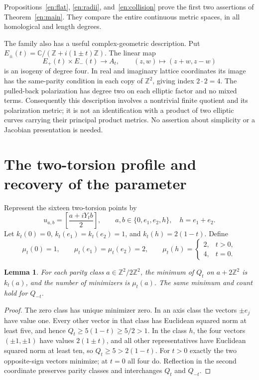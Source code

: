 \documentclass[12pt]{amsart}
\newcommand{\LemmaName}{Lemma}
\newtheorem{lem}[thm]{\LemmaName}
\theoremstyle{definition}
\theoremstyle{remark}
\numberwithin{equation}{section}
\newcommand{\Z}{\mathbb{Z}}
\newcommand{\C}{\mathbb{C}}
\begin{document}
Propositions~\ref{en:flat}, \ref{en:radii}, and~\ref{en:collision} prove the first two assertions of Theorem~\ref{en:main}. They compare the entire continuous metric spaces, in all homological and length degrees.

The family also has a useful complex-geometric description. Put
$E_\pm(t)=\C/(\Z+i(1\pm t)\Z)$.
The linear map
\begin{equation}\label{en:gluing}
E_+(t)\times E_-(t)\longrightarrow A_t,
\qquad (z,w)\longmapsto(z+w,z-w)
\end{equation}
is an isogeny of degree four. In real and imaginary lattice coordinates its image has the same-parity condition in each copy of $\Z^2$, giving index $2\cdot2=4$. The pulled-back polarization has degree two on each elliptic factor and no mixed terms. Consequently this description involves a nontrivial finite quotient and its polarization metric; it is not an identification with a product of two elliptic curves carrying their principal product metrics. No assertion about simplicity or a Jacobian presentation is needed.

\section{The two-torsion profile and recovery of the parameter}
Represent the sixteen two-torsion points by
\[
u_{a,b}=\left[\frac{a+iY_tb}{2}\right],\qquad
a,b\in\{0,e_1,e_2,h\},\quad h=e_1+e_2.
\]
Let $k_t(0)=0$, $k_t(e_1)=k_t(e_2)=1$, and $k_t(h)=2(1-t)$. Define
\[
\mu_t(0)=1,\qquad \mu_t(e_1)=\mu_t(e_2)=2,
\qquad
\mu_t(h)=\begin{cases}2,&t>0,\\4,&t=0.\end{cases}
\]

\begin{lem}\label{en:parity}
For each parity class $a\in\Z^2/2\Z^2$, the minimum of $Q_t$ on $a+2\Z^2$ is $k_t(a)$, and the number of minimizers is $\mu_t(a)$. The same minimum and count hold for $Q_{-t}$.
\end{lem}
\begin{proof}
The zero class has unique minimizer zero. In an axis class the vectors $\pm e_j$ have value one. Every other vector in that class has Euclidean squared norm at least five, and hence $Q_t\geq5(1-t)\geq5/2>1$. In the class $h$, the four vectors $(\pm1,\pm1)$ have values $2(1\pm t)$, and all other representatives have Euclidean squared norm at least ten, so $Q_t\geq5>2(1-t)$. For $t>0$ exactly the two opposite-sign vectors minimize; at $t=0$ all four do. Reflection in the second coordinate preserves parity classes and interchanges $Q_t$ and $Q_{-t}$.
\end{proof}
\end{document}
